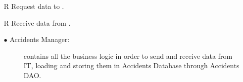 \documentclass[../DD.tex]{subfiles}
\begin{document}
\begin{itemize}
	\item[R\subs{27}]Request  data to .
	\item[R\subs{28}]Receive  data from .
	\begin{description}
	\item[$\bullet$ Accidents Manager:] contains all the business logic in order to send and receive  data from  IT, loading and storing them in Accidents Database through Accidents DAO.
	\end{description}

\end{itemize}
\end{document}
